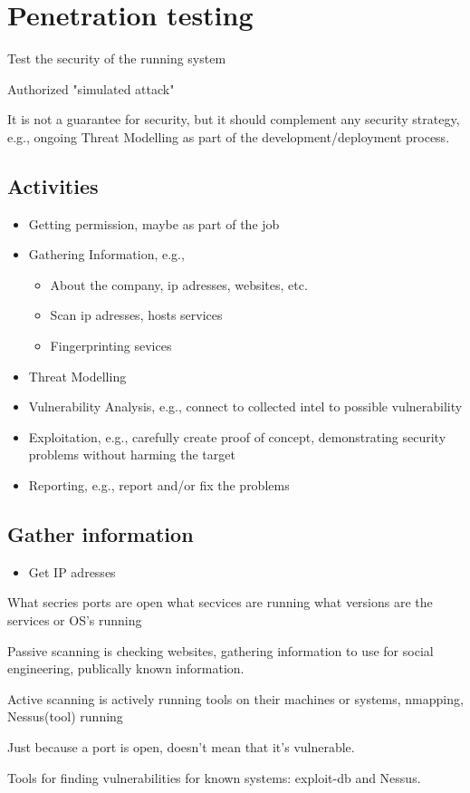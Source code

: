 \section{Penetration testing}
\begin{flushleft}
Test the security of the running system

Authorized "simulated attack"

It is not a guarantee for security, but it should complement any security strategy, e.g., ongoing Threat Modelling as part of the development/deployment process.

\subsection{Activities}
\begin{itemize}
	\item Getting permission, maybe as part of the job

	\item Gathering Information, e.g.,
		\begin{itemize}
			\item About the company, ip adresses, websites, etc.
			\item Scan ip adresses, hosts services
			\item Fingerprinting sevices
		\end{itemize}
	\item Threat Modelling

	\item Vulnerability Analysis, e.g., connect to collected intel to possible vulnerability

	\item Exploitation, e.g., carefully create proof of concept, demonstrating security problems without harming the target

	\item Reporting, e.g., report and/or fix the problems
\end{itemize}

\subsection{Gather information}
\begin{itemize}
	\item Get IP adresses
\end{itemize}
What secries ports are open
what secvices are running
what versions are the services or OS's running

Passive scanning is checking websites, gathering information to use for social engineering, publically known information.

Active scanning is actively running tools on their machines or systems, nmapping, Nessus(tool) running

Just because a port is open, doesn't mean that it's vulnerable.

Tools for finding vulnerabilities for known systems: exploit-db and Nessus.

\end{flushleft}
